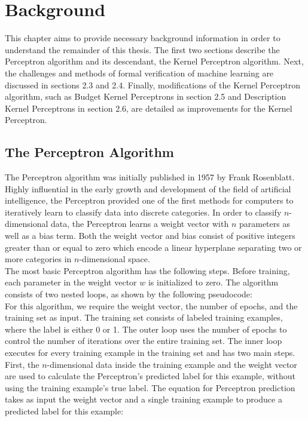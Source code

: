 \chapter{Background}
This chapter aims to provide necessary background information in order to understand the remainder of this thesis. The first two sections describe the Perceptron algorithm and its descendant, the Kernel Perceptron algorithm. Next, the challenges and methods of formal verification of machine learning are discussed in sections 2.3 and 2.4. Finally, modifications of the Kernel Perceptron algorithm, such as Budget Kernel Perceptrons in section 2.5 and Description Kernel Perceptrons in section 2.6, are detailed as improvements for the Kernel Perceptron.
\section{The Perceptron Algorithm}
The Perceptron algorithm was initially published in 1957 by Frank Rosenblatt. Highly influential in the early growth and development of the field of artificial intelligence, the Perceptron \cite{Ros57} provided one of the first methods for computers to iteratively learn to classify data into discrete categories. In order to classify $n$-dimensional data, the Perceptron learns a weight vector with $n$ parameters as well as a bias term. Both the weight vector and bias consist of positive integers greater than or equal to zero which encode a linear hyperplane separating two or more categories in $n$-dimensional space.
\\The most basic Perceptron algorithm has the following steps. Before training, each parameter in the weight vector $w$ is initialized to zero. The algorithm consists of two nested loops, as shown by the following pseudocode:
\\For this algorithm, we require the weight vector, the number of epochs, and the training set as input. The training set consists of labeled training examples, where the label is either 0 or 1. The outer loop uses the number of epochs to control the number of iterations over the entire training set. The inner loop executes for every training example in the training set and has two main steps. First, the $n$-dimensional data inside the training example and the weight vector are used to calculate the Perceptron's predicted label for this example, without using the training example's true label. The equation for Perceptron prediction takes as input the weight vector and a single training example to produce a predicted label for this example:

